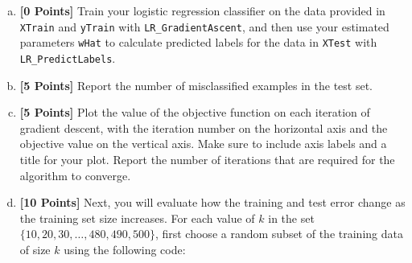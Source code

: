 \documentclass{article}
\newcommand \code [1]{{\tt #1}}
\begin{document}
\begin{enumerate}[(a)]
\begin{itemize}
\item \code{grad} is a $p+1 \times 1$ dimensional vector containing the value of the gradient of the objective function with respect to each parameter in \code{wHat}
\item \code{eta} is the gradient ascent step size that you should set to \code{eta = 0.01}
\item \code{obj}, \code{oldObj} and \code{newObj} are values of the objective function
\item \code{tol} is the convergence tolerance, which you should set to \code{tol = 0.001}
\item \code{objVals} is a vector containing the objective value at each iteration of gradient ascent
\item \code{XTest} is an $m \times p$ dimensional matrix that contains one test instance per row
\item \code{yTest} is an $m \times 1$ dimensional vector containing the true class labels for each test instance
\item \code{yHat} is an $m \times 1$ dimensional vector containing your predicted class labels for each test instance
\item \code{numErrors} is the number of misclassified examples, i.e.~the differences between \code{yHat} and \code{yTest}
\end{itemize}
To complete the \code{LR\_GradientAscent} function, you should use the helper functions \code{LR\_CalcObj}, \code{LR\_CalcGrad}, \code{LR\_UpdateParams}, and \code{LR\_CheckConvg}.
\item {\bf [0 Points]} Train your logistic regression classifier on the data provided in \code{XTrain} and \code{yTrain} with \code{LR\_GradientAscent}, and then use your estimated parameters \code{wHat} to calculate predicted labels for the data in \code{XTest} with \code{LR\_PredictLabels}. 
\item {\bf [5 Points]} Report the number of misclassified examples in the test set.
\item {\bf [5 Points]} Plot the value of the objective function on each iteration of gradient descent, with the iteration number on the horizontal axis and the objective value on the vertical axis. Make sure to include axis labels and a title for your plot. Report the number of iterations that are required for the algorithm to converge.
\item {\bf [10 Points]} Next, you will evaluate how the training and test error change as the training set size increases. For each value of $k$ in the set $\{10, 20, 30, \ldots, 480, 490, 500\}$, first choose a random subset of the training data of size $k$ using the following code:

\end{enumerate}
\end{document}

